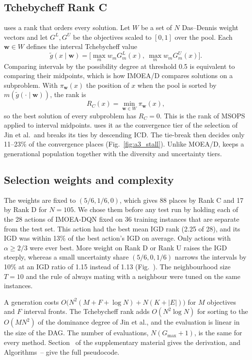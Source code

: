 \subsection{Tchebycheff Rank C}
\label{sec:rankc}
\ours{} uses a rank that orders every solution. Let $W$ be a set of $N$ Das--Dennis weight vectors \citep{das1998nbi} and let $G^L, G^U$
be the objectives scaled to $[0, 1]$ over the pool. Each $\mathbf{w} \in W$ defines the interval Tchebycheff value
\begin{equation}
\tilde g(x \mid \mathbf{w}) = \big[\max_m w_m G^L_m(x),\ \max_m w_m G^U_m(x)\big].
\label{eq:tch}
\end{equation}
Comparing intervals by the possibility degree at threshold 0.5 is equivalent to comparing their midpoints, which is how
IMOEA/D compares solutions on a subproblem. With $\pi_{\mathbf{w}}(x)$ the position of $x$ when the pool is sorted by
$m(\tilde g(\cdot \mid \mathbf{w}))$, the rank is
\begin{equation}
R_C(x) = \min_{\mathbf{w} \in W} \pi_{\mathbf{w}}(x),
\label{eq:rankc}
\end{equation}
so the best solution of every subproblem has $R_C = 0$. This is the rank of MSOPS \citep{hughes2003msops} applied to
interval midpoints. \ours{} uses it as the convergence tier of the selection of Jin et al.\ and breaks its ties by
descending ICD. The tie-break then decides only 11--23\% of the convergence places (Fig.~\ref{fig:a3_stall}). Unlike
MOEA/D, \ours{} keeps a generational population together with the diversity and uncertainty tiers.

\subsection{Selection weights and complexity}
\label{sec:weights}
\label{sec:complexity}
The weights are fixed to $(5/6, 1/6, 0)$, which gives 88 places by Rank C and 17 by Rank D for $N = 105$. We chose them
before any test run by holding each of the 28 actions of IMOEA-DQN fixed on 36 training instances that are separate
from the test set. This action had the best mean IGD rank (2.25 of 28), and its IGD was within 13\% of the best
action's IGD on average. Only actions with $\alpha \ge 2/3$ were ever best. More weight on Rank D or Rank U raises the
IGD steeply, whereas a small uncertainty share $(5/6, 0, 1/6)$ narrows the intervals by 10\% at an IGD ratio of 1.15
instead of 1.13 (Fig.~). The neighbourhood size $T = 10$ and the rule of always mating with a
neighbour were tuned on the same instances.

A generation costs $O\big(N^2(M + F + \log N) + N(K + |E|)\big)$ for $M$ objectives and $F$ interval fronts. The
Tchebycheff rank adds $O(N^2 \log N)$ for sorting to the $O(MN^2)$ of the dominance degree of Jin et al., and the
evaluation is linear in the size of the DAG. The number of evaluations, $N(G_{\max} + 1)$, is the same for every
method. Section~ of the supplementary material gives the derivation, and
Algorithms~-- give the full pseudocode.
